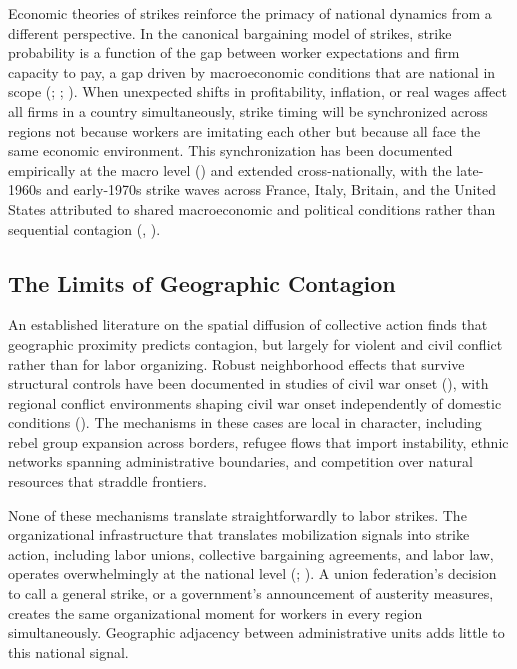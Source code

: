 \documentclass[
  11pt,
]{article}
\begin{document}
Economic theories of strikes reinforce the primacy of national dynamics
from a different perspective. In the canonical bargaining model of
strikes, strike probability is a function of the gap between worker
expectations and firm capacity to pay, a gap driven by macroeconomic
conditions that are national in scope
(;
;
). When unexpected shifts in
profitability, inflation, or real wages affect all firms in a country
simultaneously, strike timing will be synchronized across regions not
because workers are imitating each other but because all face the same
economic environment. This synchronization has been documented
empirically at the macro level () and
extended cross-nationally, with the late-1960s and early-1970s strike
waves across France, Italy, Britain, and the United States attributed to
shared macroeconomic and political conditions rather than sequential
contagion (,
).

\subsection{The Limits of Geographic
Contagion}\label{the-limits-of-geographic-contagion}

An established literature on the spatial diffusion of collective action
finds that geographic proximity predicts contagion, but largely for
violent and civil conflict rather than for labor organizing. Robust
neighborhood effects that survive structural controls have been
documented in studies of civil war onset
(), with regional
conflict environments shaping civil war onset independently of domestic
conditions (). The mechanisms in these cases are local in character, including
rebel group expansion across borders, refugee flows that import
instability, ethnic networks spanning administrative boundaries, and
competition over natural resources that straddle frontiers.

None of these mechanisms translate straightforwardly to labor strikes.
The organizational infrastructure that translates mobilization signals
into strike action, including labor unions, collective bargaining
agreements, and labor law, operates overwhelmingly at the national level
(;
). A union federation's
decision to call a general strike, or a government's announcement of
austerity measures, creates the same organizational moment for workers
in every region simultaneously. Geographic adjacency between
administrative units adds little to this national signal.
\end{document}
